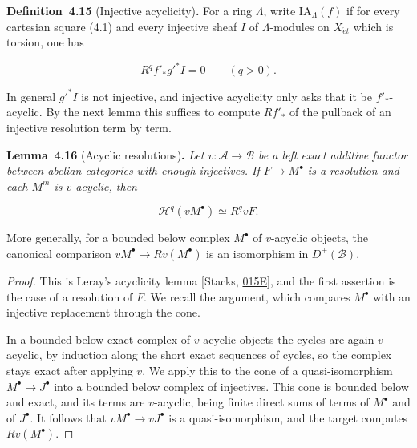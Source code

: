 \documentclass[11pt]{article}
\newenvironment{bpstatement}[2]{\par\addvspace{0.6\baselineskip}\noindent\textbf{#1}#2\textbf{.}\enspace\ignorespaces}
  {\par\addvspace{0.4\baselineskip}}
\newenvironment{bpstatementit}[2]{\begin{bpstatement}{#1}{#2}\itshape\ignorespaces}{\end{bpstatement}}
\begin{document}
\label{bp324}%
\begin{bpstatement}{Definition~4.15}{ (Injective acyclicity)}
For a ring \(\Lambda\), write \(\mathrm{IA}_{\Lambda}(f)\) if for every cartesian square (4.1) and every injective sheaf \(I\) of \(\Lambda\)-modules on \(X_{\acute{e}t}\) which is torsion, one has

\[
R^qf'_*g'^*I=0\qquad(q>0).
\]
\end{bpstatement}

\label{bp325}%
In general \(g'^*I\) is not injective, and injective acyclicity only asks that it be \(f'_*\)-acyclic. By the next lemma this suffices to compute \(Rf'_*\) of the pullback of an injective resolution term by term.

\label{bp326}%
\begin{bpstatementit}{Lemma~4.16}{ (Acyclic resolutions)}
Let \(v:\mathcal A\to\mathcal B\) be a left exact additive functor between abelian categories with enough injectives. If \(F\to M^\bullet\) is a resolution and each \(M^m\) is \(v\)-acyclic, then

\[
\mathcal H^q(vM^\bullet)\simeq R^qvF.
\]

More generally, for a bounded below complex \(M^\bullet\) of \(v\)-acyclic objects, the canonical comparison \(vM^\bullet\to Rv(M^\bullet)\) is an isomorphism in \(D^+(\mathcal B)\).
\end{bpstatementit}

\begin{proof}[{Proof}]\label{bp327}%
This is Leray's acyclicity lemma [Stacks, \href{https://stacks.math.columbia.edu/tag/015E}{015E}], and the first assertion is the case of a resolution of \(F\). We recall the argument, which compares \(M^\bullet\) with an injective replacement through the cone.

In a bounded below exact complex of \(v\)-acyclic objects the cycles are again \(v\)-acyclic, by induction along the short exact sequences of cycles, so the complex stays exact after applying \(v\). We apply this to the cone of a quasi-isomorphism \(M^\bullet\to J^\bullet\) into a bounded below complex of injectives. This cone is bounded below and exact, and its terms are \(v\)-acyclic, being finite direct sums of terms of \(M^\bullet\) and of \(J^\bullet\). It follows that \(vM^\bullet\to vJ^\bullet\) is a quasi-isomorphism, and the target computes \(Rv(M^\bullet)\).
\end{proof}
\end{document}
